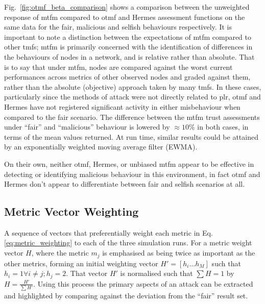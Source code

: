 Fig.~\ref{fig:otmf_beta_comparison} shows a comparison between the unweighted response of \gls{mtfm} compared to \gls{otmf} and Hermes assessment functions on the same data for the fair, malicious and selfish behaviours respectively.
It is important to note a distinction between the expectations of \gls{mtfm} compared to other \glspl{tmf}; \gls{mtfm} is primarily concerned with the identification of differences in the behaviours of nodes in a network, and is relative rather than absolute.
That is to say that under \gls{mtfm}, nodes are compared against the worst current performances across metrics of other observed nodes and graded against them, rather than the absolute (objective) approach taken by many \glspl{tmf}.
In these cases, particularly since the methods of attack were not directly related to \gls{plr}, \gls{otmf} and Hermes have not registered significant activity in either misbehaviour when compared to the fair scenario.
The difference between the \gls{mtfm} trust assessments under ``fair'' and ``malicious'' behaviour is lowered by $\approx 10\%$ in both cases, in terms of the mean values returned.
At run time, similar results could be attained by an exponentially weighted moving average filter (EWMA).

On their own, neither \gls{otmf}, Hermes, or unbiased \gls{mtfm} appear to be effective in detecting or identifying malicious behaviour in this environment, in fact \gls{otmf} and Hermes don't appear to differentiate between fair and selfish scenarios at all.


\subsection{Metric Vector Weighting}\label{sec:metric_weighting}
%

A sequence of vectors that preferentially weight each metric in Eq. \eqref{eq:metric_weighting} to each of the three simulation runs.
For a metric weight vector $H$, where the metric $m_j$ is emphasised as being twice as important as the other metrics, forming an initial weighting vector $H'=[h_i\dots h_M]$ such that $h_i = 1 \forall i \ne j; h_j=2$.
That vector $H'$ is normalised such that $\sum H = 1$ by $H= \frac{H'}{\sum H'}$.
Using this process the primary aspects of an attack can be extracted and highlighted by comparing against the deviation from the ``fair'' result set. 

